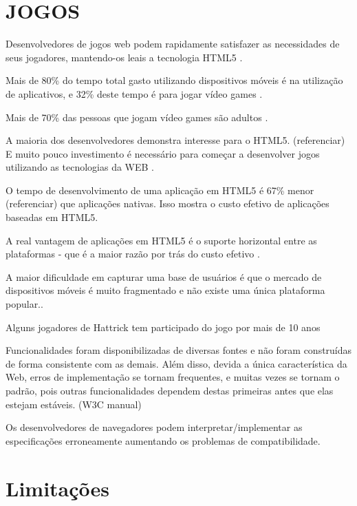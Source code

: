 
\section{JOGOS}

\begin{draft}
Desenvolvedores de jogos web podem rapidamente satisfazer as
necessidades de seus jogadores, mantendo-os leais a tecnologia HTML5
\autocite{developingEffect}.

Mais de 80\% do tempo total gasto utilizando dispositivos móveis é na
utilização de aplicativos, e 32\% deste tempo é para jogar vídeo
games \autocite{HTML5CrossPlatformGameDevelopment}.

Mais de 70\% das pessoas que jogam vídeo games são adultos
\autocite{gamebenefits}.

A maioria dos desenvolvedores demonstra interesse para o HTML5.
(referenciar) E muito pouco investimento é necessário para
começar a desenvolver jogos utilizando as tecnologias da WEB
\autocite{html5mostwanted}.

O tempo de desenvolvimento de uma aplicação em HTML5 é 67\% menor
(referenciar) que aplicações nativas. Isso mostra o custo efetivo de
aplicações baseadas em HTML5.

A real vantagem de aplicações em HTML5 é o suporte horizontal entre
as plataformas - que é a maior razão por trás do custo efetivo
\autocite{html5Tradeoffs}.

A maior dificuldade em capturar uma base de usuários é que o mercado
de dispositivos móveis é muito fragmentado e não existe uma única
plataforma popular.\autocite{html5Tradeoffs}.

Alguns jogadores de Hattrick tem participado do jogo por mais de 
10 anos \autocite{gameCommunities}

Funcionalidades foram disponibilizadas de diversas fontes e não foram
construídas de forma consistente com as demais. Além disso,
devida a única característica da Web, erros de implementação se
tornam frequentes, e muitas vezes se tornam o padrão, pois outras
funcionalidades dependem destas primeiras antes que elas estejam
estáveis. (W3C manual)

Os desenvolvedores de navegadores podem interpretar/implementar
as especificações erroneamente aumentando os problemas de
compatibilidade.

\section{Limitações}


\end{draft}
